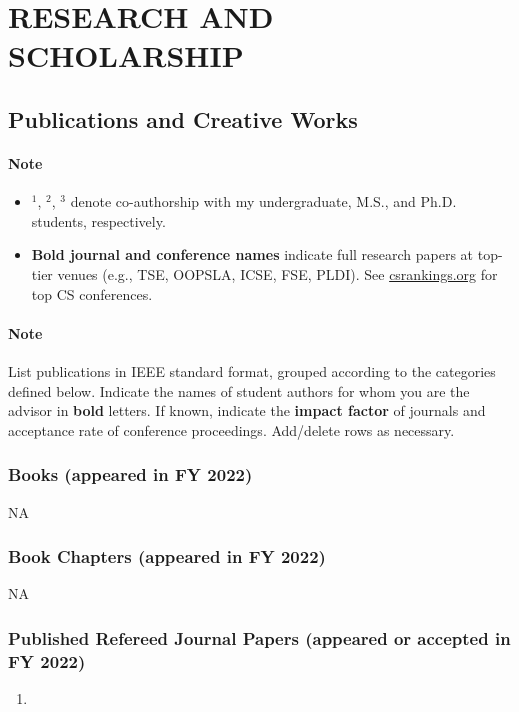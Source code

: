\documentclass[11pt]{article}
\newcommand{\fy}{2022}
\newcommand{\mypubcc}[1]{\item~\label{#1} \fullcite{\detokenize{#1}c}}
\begin{document}
\newpage
\section{RESEARCH AND SCHOLARSHIP}

\subsection{Publications and Creative Works}

\paragraph{Note}
\begin{itemize}
\item \(^1\), \(^2\), \(^3\) denote co-authorship with my undergraduate, M.S., and Ph.D. students, respectively.
\item \textbf{Bold journal and conference names} indicate full research papers at top-tier venues (e.g., TSE, OOPSLA, ICSE, FSE, PLDI). See \href{https://csrankings.org}{csrankings.org} for top CS conferences.
\end{itemize}
  
\paragraph{Note} List publications in IEEE standard format, grouped according to the categories defined below. Indicate the names of student authors for whom
you are the advisor in \textbf{bold} letters. If known, indicate the
\textbf{impact factor} of journals and acceptance rate of conference
proceedings. Add/delete rows as necessary.

\subsubsection{Books (appeared in FY \fy{})}
NA
\subsubsection{Book Chapters (appeared in FY \fy{})}
NA
\subsubsection{Published Refereed Journal Papers (appeared or accepted in FY \fy{})}

\begin{enumerate}
  \mypubcc{nguyen2021using}
  
\end{enumerate}
\end{document}
